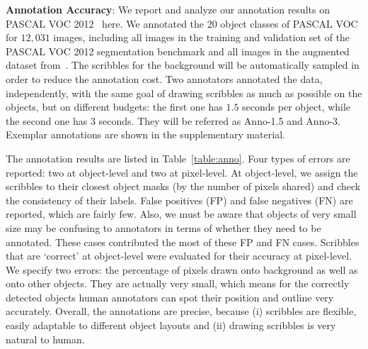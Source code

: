 \textbf{Annotation Accuracy}: 
We report and analyze our annotation results on PASCAL VOC 2012~\citep{pascal:2011} here. 
We annotated the 20 object classes of PASCAL VOC for $12,031$ images, including all images in the training and validation set of the PASCAL
VOC 2012 segmentation benchmark and all images in the augmented
dataset from~\citep{semantic:contour}. The scribbles for the background will be automatically sampled in order to reduce the annotation cost. 
Two annotators annotated the data, independently, with the same goal of drawing scribbles as much as possible on the objects, but on different
budgets: the first one has $1.5$ seconds per object, while the second
one has $3$ seconds. They will be referred as Anno-1.5 and
Anno-3. Exemplar annotations are shown in the
supplementary material.

The annotation results  are
listed in Table~\ref{table:anno}. Four types of errors are reported:
two at object-level and two at pixel-level. At object-level, we assign
the scribbles to their closest object masks (by the number of pixels
shared) and check the consistency of their labels. False positives (FP) and
false negatives (FN) are reported, which are fairly few. Also, we must be
aware that objects of very small size may be confusing to annotators
in terms of whether they need to be annotated. These cases
contributed the most of these FP and FN cases. Scribbles that are
`correct' at object-level were evaluated for their accuracy at
pixel-level. We specify two errors: the percentage of pixels drawn
onto background as well as onto other objects. They are actually very
small, which means for the correctly detected objects human annotators can spot
their position and outline very accurately.  Overall, the annotations are precise, because (i) scribbles are flexible,  easily adaptable to different object layouts and (ii) drawing scribbles is very natural to human.


